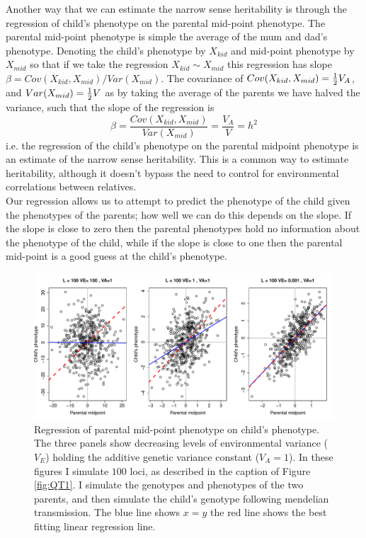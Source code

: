 Another way that we can estimate the narrow sense heritability is
through the regression of child's phenotype on the parental mid-point
phenotype. The parental mid-point phenotype is simple the average of
the mum and dad's phenotype. Denoting the child's phenotype by $X_{kid}$ and mid-point
phenotype by $X_{mid}$ so that if we take the regression $X_{kid} \sim X_{mid}$ this
regression has slope $\beta = Cov(X_{kid},X_{mid})/Var(X_{mid})$.
The covariance of $Cov(X_{kid},X_{mid})=\tfrac{1}{2}
V_A$, and $Var(X_{mid}) = \tfrac{1}{2} V$ as by taking the average of the
parents we have halved the variance, such that the slope of the
regression is
\begin{equation}
\beta= \frac{Cov(X_{kid},X_{mid})}{Var(X_{mid})} = \frac{V_A}{V} = h^2
\end{equation}
i.e. the regression of the child's phenotype on the parental midpoint
phenotype is an estimate of the narrow sense heritability. This is a
common way to estimate heritability, although it doesn't bypass the
need to control for environmental correlations between relatives. \\

Our regression allows us to attempt to predict the phenotype of the
child given the phenotypes of the parents; how well we can do this depends on the
slope. If the slope is close to zero then the parental phenotypes hold no
information about the phenotype of the child, while if the slope is
close to one then the parental mid-point is a good guess at the child's
phenotype.\\
\begin{figure}
\begin{center}
\includegraphics[width=\textwidth]{figures/QT2.pdf}
\end{center}
\caption{Regression of parental mid-point phenotype on child's
  phenotype. The three panels show decreasing levels of environmental
  variance ($V_E$) holding the additive genetic variance constant ($V_A=1$). 
 In these figures I simulate $100$ loci, as described in
 the caption of Figure \ref{fig:QT1}. I simulate the genotypes and
 phenotypes of the two parents, and then simulate the child's genotype
following mendelian transmission. The blue line shows $x=y$ the red
line shows the best fitting linear regression line. }
\end{figure}

